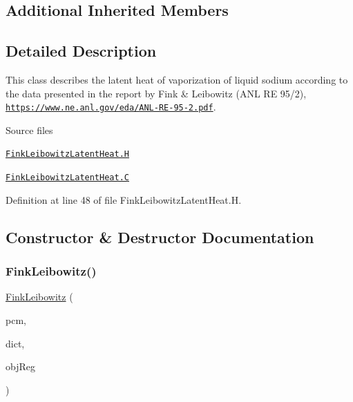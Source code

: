 \subsection*{Additional Inherited Members}


\subsection{Detailed Description}
This class describes the latent heat of vaporization of liquid sodium according to the data presented in the report by Fink \& Leibowitz (A\+NL RE 95/2), \href{https://www.ne.anl.gov/eda/ANL-RE-95-2.pdf}{\tt https\+://www.\+ne.\+anl.\+gov/eda/\+A\+N\+L-\/\+R\+E-\/95-\/2.\+pdf}. 

\label{_Description}%
 \begin{DoxyParagraph}{Source files}

\begin{DoxyItemize}
\item \href{../../../home/carlo/data/GeN-Foam/GeN-Foam_ffn/GeN-Foam/GeN-Foam/classes/thermalHydraulics/src/physicsModels/phaseChangeModels/latentHeatModels/FinkLeibowitz/FinkLeibowitzLatentHeat.H}{\tt Fink\+Leibowitz\+Latent\+Heat.\+H} 
\item \href{../../../home/carlo/data/GeN-Foam/GeN-Foam_ffn/GeN-Foam/GeN-Foam/classes/thermalHydraulics/src/physicsModels/phaseChangeModels/latentHeatModels/FinkLeibowitz/FinkLeibowitzLatentHeat.C}{\tt Fink\+Leibowitz\+Latent\+Heat.\+C} 
\end{DoxyItemize}
\end{DoxyParagraph}


Definition at line 48 of file Fink\+Leibowitz\+Latent\+Heat.\+H.



\subsection{Constructor \& Destructor Documentation}
\mbox{\label{classFoam_1_1latentHeatModels_1_1FinkLeibowitz_a5fc9b434c25af2ab8044b519974e95ae}} 
\subsubsection{\texorpdfstring{Fink\+Leibowitz()}{FinkLeibowitz()}}
{\footnotesize\ttfamily \hyperlink{classFoam_1_1latentHeatModels_1_1FinkLeibowitz}{Fink\+Leibowitz} (\begin{DoxyParamCaption}\item[{const \hyperlink{classFoam_1_1phaseChangeModel}{phase\+Change\+Model} \&}]{pcm,  }\item[{const dictionary \&}]{dict,  }\item[{const object\+Registry \&}]{obj\+Reg }\end{DoxyParamCaption})}



